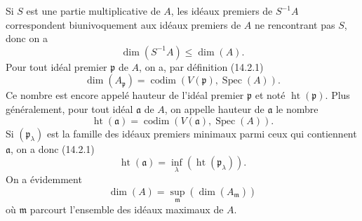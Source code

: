 \begin{env}[16.1.3]
\label{0.16.1.3-fr}
Si $S$ est une partie multiplicative de $A$, les idéaux premiers de $S^{-1}A$
correspondent biunivoquement aux idéaux premiers de $A$ ne rencontrant pas
$S$, donc on a
\[
\label{0.16.1.3.1-fr}
  \dim(S^{-1}A)\leq\dim(A).
\tag{16.1.3.1}
\]
Pour tout idéal premier $\mathfrak{p}$ de $A$, on a, par définition (14.2.1)
\[
\label{0.16.1.3.2-fr}
  \dim(A_{\mathfrak{p}})
  =\operatorname{codim}(V(\mathfrak{p}),\operatorname{Spec}(A)).
\tag{16.1.3.2}
\]
Ce nombre est encore appelé hauteur de l'idéal premier $\mathfrak{p}$ et noté
$\operatorname{ht}(\mathfrak{p})$. Plus généralement, pour tout idéal
$\mathfrak{a}$ de $A$, on appelle hauteur de $\mathfrak{a}$ le nombre
\[
\label{0.16.1.3.3-fr}
  \operatorname{ht}(\mathfrak{a})
  =\operatorname{codim}(V(\mathfrak{a}),\operatorname{Spec}(A)).
\tag{16.1.3.3}
\]
Si $(\mathfrak{p}_\lambda)$ est la famille des idéaux premiers minimaux parmi
ceux qui contiennent $\mathfrak{a}$, on a donc (14.2.1)
\[
\label{0.16.1.3.4-fr}
  \operatorname{ht}(\mathfrak{a})
  =\inf_\lambda(\operatorname{ht}(\mathfrak{p}_\lambda)).
\tag{16.1.3.4}
\]
On a évidemment
\[
\label{0.16.1.3.5-fr}
  \dim(A)=\sup_{\mathfrak{m}}(\dim(A_{\mathfrak{m}}))
\tag{16.1.3.5}
\]
où $\mathfrak{m}$ parcourt l'ensemble des idéaux maximaux de $A$.
\end{env}

